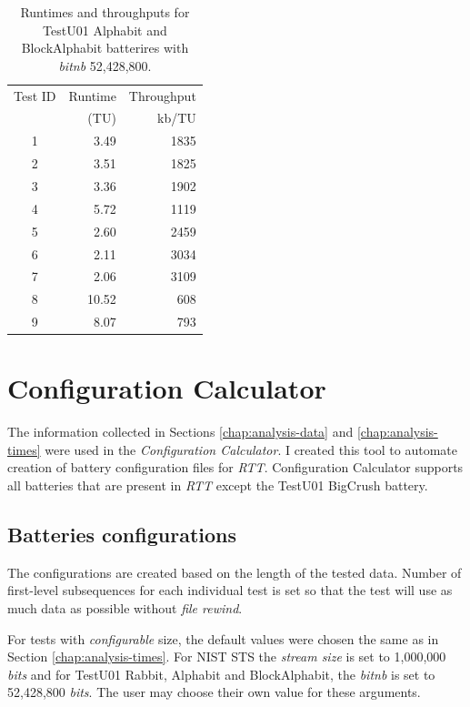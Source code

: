\documentclass[
  digital,     %
  oneside,     %
  nosansbold,  %
  nocolorbold, %
  nolof,         %
  nolot,         %
]{fithesis4}
\begin{document}
\begin{table}[H]
  \begin{tabularx}{0.5\textwidth}{c|r|r}
  Test ID & Runtime & Throughput \\
         & (TU) &  kb/TU\\
  \midrule
        1 & 3.49 & 1835 \\
        2 & 3.51 & 1825 \\
        3 & 3.36 & 1902 \\
        4 & 5.72 & 1119 \\
        5 & 2.60 & 2459 \\
        6 & 2.11 & 3034 \\
        7 & 2.06 & 3109 \\
        8 & 10.52 & 608 \\
        9 & 8.07 & 793 \\
  \end{tabularx}
  \caption{Runtimes and throughputs for TestU01 Alphabit and BlockAlphabit batterires with \emph{bit\textunderscore nb} 52,428,800.}
  \label{tab:analysis_alphabit_time}
\end{table}


\section{Configuration Calculator} \label{chap:analysis-config-calc}

The information collected in Sections \ref{chap:analysis-data} and \ref{chap:analysis-times} were used in the \emph{Configuration Calculator}. I created this tool to automate creation of battery configuration files for \emph{RTT}. Configuration Calculator supports all batteries that are present in \emph{RTT} except the TestU01 BigCrush battery.

\subsection{Batteries configurations}

The configurations are created based on the length of the tested data. Number of first-level subsequences for each individual test is set so that the test will use as much data as possible without \emph{file rewind}.

For tests with \emph{configurable} size, the default values were chosen the same as in Section \ref{chap:analysis-times}. For NIST STS the \emph{stream size} is set to 1,000,000 \emph{bits} and for TestU01 Rabbit, Alphabit and BlockAlphabit, the \emph{bit\textunderscore nb} is set to  52,428,800 \emph{bits}. The user may choose their own value for these arguments.
\end{document}
